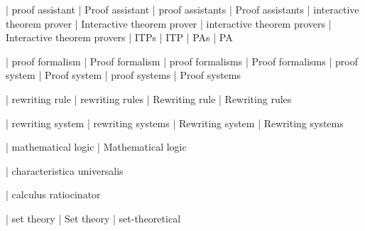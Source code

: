 




 | proof assistant
 | Proof assistant
 | proof assistants
 | Proof assistants
 | interactive theorem prover
 | Interactive theorem prover
 | interactive theorem provers
 | Interactive theorem provers
 | ITPs
 | ITP
 | PAs
 | PA

 | proof formalism
 | Proof formalism
 | proof formalisms
 | Proof formalisms
 | proof system
 | Proof system
 | proof systems
 | Proof systems

 | rewriting rule
 | rewriting rules
 | Rewriting rule
 | Rewriting rules

 | rewriting system
 | rewriting systems
 | Rewriting system
 | Rewriting systems

 | mathematical logic
 | Mathematical logic

 | characteristica universalis

 | calculus ratiocinator
 
 | set theory
 | Set theory
 | set-theoretical

